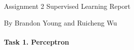 \documentclass[12pt, letterpaper]{article}
\begin{document}
Assignment 2 Supervised Learning Report

By Brandon Young and Ruicheng Wu

\bigskip

\paragraph{Task 1. Perceptron} \mbox{}\\
\end{document}
